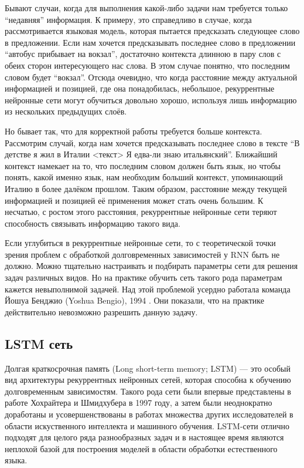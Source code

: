 \documentclass[14pt]{extarticle}
\begin{document}
Бывают случаи, когда для выполнения какой-либо задачи нам требуется только “недавняя” информация. К примеру, это справедливо в случае, когда рассмотривается языковая модель, которая пытается предсказать следующее слово в предложении. Если нам хочется предсказывать последнее слово в предложении “автобус прибывает на вокзал”, достаточно контекста длинною в пару слов с обеих сторон интересующего нас слова. В этом случае понятно, что последним словом будет “вокзал”. Отсюда очевидно, что когда расстояние между актуальной информацией и позицией, где она понадобилась, небольшое, рекуррентные нейронные сети могут обучиться довольно хорошо, используя лишь информацию из нескольких предыдущих слоёв.

Но бывает так, что для корректной работы требуется больше контекста. Рассмотрим случай, когда нам хочется предсказывать последнее слово в тексте “В детстве я жил в Италии <текст> Я едва-ли знаю итальянский”. Ближайший контекст намекает на то, что последним словом должен быть язык, но чтобы понять, какой именно язык, нам необходим больший контекст, упоминающий Италию в более далёком прошлом. Таким образом, расстояние между текущей информацией и позицией её применения может стать очень большим. К несчатью, с ростом этого расстояния, рекуррентные нейронные сети теряют способность связывать информацию такого вида.

Если углубиться в рекуррентные нейронные сети, то с теоретической точки зрения проблем с обработкой долговременных зависимостей у RNN быть не должно. Можно тщательно настраивать и подбирать параметры сети для решения задач различных видов. Но на практике обучить сеть такого рода параметрам кажется невыполнимой задачей. Над этой проблемой усердно работала команда Йошуа Бенджио (Yoshua Bengio), 1994 \cite{Bengio}. Они показали, что на практике действительно невозможно разрешить данную задачу.

\subsection{LSTM сеть}

Долгая краткосрочная память (Long short-term memory; LSTM) --- это особый вид архитектуры рекуррентных нейронных сетей, которая способна к обучению долговременным зависимостям. Такого рода сети были впервые представлены в работе Хохрайтера и Шмидхубера в 1997 \cite{Hochreiter} году, а затем были неоднократно доработаны и усовершенствованы в работах множества других исследователей в области искуственного интеллекта и машинного обучения. LSTM-сети отлично подходят для целого ряда разнообразных задач и в настоящее время являются неплохой базой для построения моделей в области обработки естественного языка.
\end{document}
